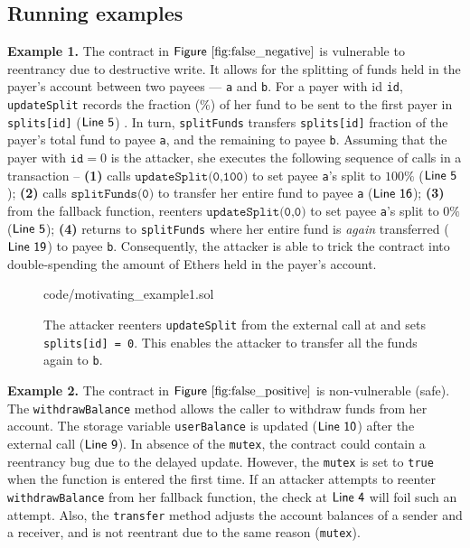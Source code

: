 \documentclass[conference, romanappendices]{tex/IEEEtran}
\theoremstyle{bfnote}
\newcommand{\reentrancy}{{reentrancy}\xspace}
\newcommand{\Line}[1]{\ensuremath{\sf Line~ #1}}
\newcommand{\Fig}[1]{\ensuremath{\sf Figure~\ref{#1}}}
\begin{document}
\subsection{\textbf{Running examples}}
\noindent
\textbf{Example 1.}
The contract in \Fig{fig:false_negative} is vulnerable to \reentrancy due to destructive write.
It allows for the splitting of funds held in the payer's account between two payees --- \texttt{a} and \texttt{b}.
For a payer with id \texttt{id}, \texttt{updateSplit} records the fraction ($\%$) of her fund to be sent to the first payer in \texttt{splits[id]} (\Line{5}) .
In turn, \texttt{splitFunds} transfers \texttt{splits[id]} fraction of the payer's total fund to payee \texttt{a}, and the remaining to payee \texttt{b}.
Assuming that the payer with $\texttt{id}=0$ is the attacker, she executes the following sequence of calls in a transaction --
\textbf{(1)} calls $\texttt{updateSplit(0,100)}$ to set payee \texttt{a}'s split to $100\%$ (\Line{5});
\textbf{(2)} calls $\texttt{splitFunds(0)}$ to transfer her entire fund to payee \texttt{a} (\Line{16});
\textbf{(3)} from the fallback function, reenters $\texttt{updateSplit(0,0)}$ to set payee \texttt{a}'s split to $0\%$ (\Line{5});
\textbf{(4)} returns to \texttt{splitFunds} where her entire fund is \textit{again} transferred (\Line{19}) to payee \texttt{b}.
Consequently, the attacker is able to trick the contract into double-spending the amount of Ethers held in the payer's account.
\begin{figure}[t]
		
		{code/motivating_example1.sol}
	\vspace{-0.15in}
	\caption{\small The attacker reenters \texttt{updateSplit} from the external call at  and sets \texttt{splits[id] = 0}.
		This enables the attacker to transfer all the funds again to \texttt{b}.}
	\label{fig:false_negative}
	\vspace{-7mm}
\end{figure}


\noindent
\textbf{Example 2.}
The contract in \Fig{fig:false_positive} is non-vulnerable (safe).
The \texttt{withdrawBalance} method allows the caller to withdraw funds from her account.
The storage variable \texttt{userBalance} is updated (\Line{10}) after the external call (\Line{9}).
In absence of the \texttt{mutex}, the contract could contain a \reentrancy bug due to the delayed update. 
However, the \texttt{mutex} is set to \texttt{true} when the function is entered the first time.
If an attacker attempts to reenter \texttt{withdrawBalance} from her fallback function, the check at \Line{4} will foil such an attempt.
Also, the \texttt{transfer} method adjusts the account balances of a sender and a receiver, and is not reentrant due to the same reason (\texttt{mutex}).
\end{document}
